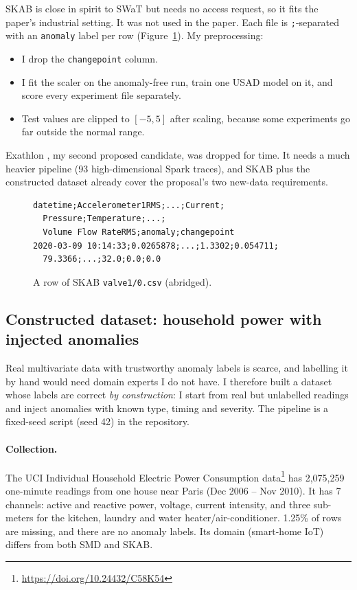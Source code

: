 \documentclass[11pt]{article}
\begin{document}
SKAB is close in spirit to SWaT but needs no access request, so it fits the paper's industrial setting. It was not used in the paper. Each file is \texttt{;}-separated with an \texttt{anomaly} label per row (Figure~\ref{fig:snip-skab}). My preprocessing:
\begin{itemize}
\item I drop the \texttt{changepoint} column.
\item I fit the scaler on the anomaly-free run, train one USAD model on it, and score every experiment file separately.
\item Test values are clipped to $[-5, 5]$ after scaling, because some experiments go far outside the normal range.
\end{itemize}
Exathlon \citep{jacob2021exathlon}, my second proposed candidate, was dropped for time. It needs a much heavier pipeline (93 high-dimensional Spark traces), and SKAB plus the constructed dataset already cover the proposal's two new-data requirements.

\begin{figure}[t]
\centering
\scriptsize
\begin{verbatim}
datetime;Accelerometer1RMS;...;Current;
  Pressure;Temperature;...;
  Volume Flow RateRMS;anomaly;changepoint
2020-03-09 10:14:33;0.0265878;...;1.3302;0.054711;
  79.3366;...;32.0;0.0;0.0
\end{verbatim}
\vspace{-1.5em}
\caption{A row of SKAB \texttt{valve1/0.csv} (abridged).}
\label{fig:snip-skab}
\end{figure}

\subsection{Constructed dataset: household power with injected anomalies}
Real multivariate data with trustworthy anomaly labels is scarce, and labelling it by hand would need domain experts I do not have. I therefore built a dataset whose labels are correct \emph{by construction}: I start from real but unlabelled readings and inject anomalies with known type, timing and severity. The pipeline is a fixed-seed script (seed 42) in the repository.

\paragraph{Collection.} The UCI Individual Household Electric Power Consumption data\footnote{\url{https://doi.org/10.24432/C58K54}} \citep{hebrail2012} has 2,075,259 one-minute readings from one house near Paris (Dec 2006 -- Nov 2010). It has 7 channels: active and reactive power, voltage, current intensity, and three sub-meters for the kitchen, laundry and water heater/air-conditioner. 1.25\% of rows are missing, and there are no anomaly labels. Its domain (smart-home IoT) differs from both SMD and SKAB.
\end{document}
